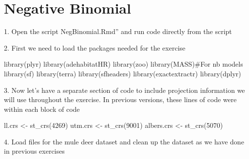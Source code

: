 \documentclass[
  letterpaper,
]{book}
\newenvironment{Shaded}{\begin{snugshade}}{\end{snugshade}}
\newcommand{\CommentTok}[1]{\textcolor[rgb]{0.37,0.37,0.37}{#1}}
\newcommand{\DecValTok}[1]{\textcolor[rgb]{0.68,0.00,0.00}{#1}}
\newcommand{\FunctionTok}[1]{\textcolor[rgb]{0.28,0.35,0.67}{#1}}
\newcommand{\NormalTok}[1]{\textcolor[rgb]{0.00,0.23,0.31}{#1}}
\newcommand{\OtherTok}[1]{\textcolor[rgb]{0.00,0.23,0.31}{#1}}
\begin{document}
\hypertarget{negative-binomial}{%
\chapter{Negative Binomial}\label{negative-binomial}}

1. Open the script NegBinomial.Rmd'' and run code directly from the
script

2. First we need to load the packages needed for the exercise

\begin{Shaded}
\begin{Highlighting}[]
\FunctionTok{library}\NormalTok{(plyr)}
\FunctionTok{library}\NormalTok{(adehabitatHR)}
\FunctionTok{library}\NormalTok{(zoo)}
\FunctionTok{library}\NormalTok{(MASS)}\CommentTok{\#For nb models}
\FunctionTok{library}\NormalTok{(sf)}
\FunctionTok{library}\NormalTok{(terra)}
\FunctionTok{library}\NormalTok{(sfheaders)}
\FunctionTok{library}\NormalTok{(exactextractr)}
\FunctionTok{library}\NormalTok{(dplyr)}
\end{Highlighting}
\end{Shaded}

3. Now let's have a separate section of code to include projection
information we will use throughout the exercise. In previous versions,
these lines of code were within each block of code

\begin{Shaded}
\begin{Highlighting}[]
\NormalTok{ll.crs }\OtherTok{\textless{}{-}} \FunctionTok{st\_crs}\NormalTok{(}\DecValTok{4269}\NormalTok{) }
\NormalTok{utm.crs }\OtherTok{\textless{}{-}} \FunctionTok{st\_crs}\NormalTok{(}\DecValTok{9001}\NormalTok{) }
\NormalTok{albers.crs }\OtherTok{\textless{}{-}} \FunctionTok{st\_crs}\NormalTok{(}\DecValTok{5070}\NormalTok{)}
\end{Highlighting}
\end{Shaded}

4. Load files for the mule deer dataset and clean up the dataset as we
have done in previous exercises
\end{document}

